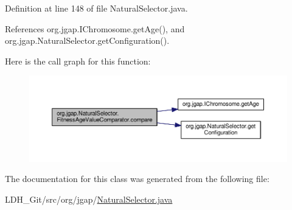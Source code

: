 Definition at line 148 of file Natural\-Selector.\-java.



References org.\-jgap.\-I\-Chromosome.\-get\-Age(), and org.\-jgap.\-Natural\-Selector.\-get\-Configuration().



Here is the call graph for this function\-:
\nopagebreak
\begin{figure}[H]
\begin{center}
\leavevmode
\includegraphics[width=350pt]{classorg_1_1jgap_1_1_natural_selector_1_1_fitness_age_value_comparator_a15809e3ede2182056a1c4747449e0575_cgraph}
\end{center}
\end{figure}




The documentation for this class was generated from the following file\-:\begin{DoxyCompactItemize}
\item 
L\-D\-H\-\_\-\-Git/src/org/jgap/\hyperlink{_natural_selector_8java}{Natural\-Selector.\-java}\end{DoxyCompactItemize}
